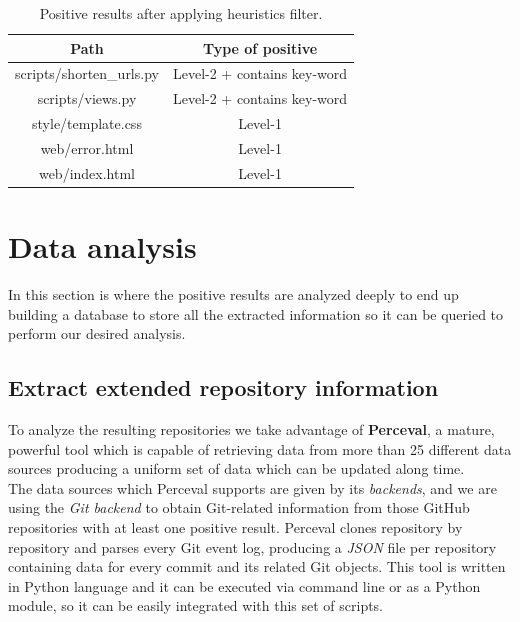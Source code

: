 \documentclass[a4paper, 12pt]{book}
\begin{document}
\begin{table}[]
\centering
\caption{Positive results after applying heuristics filter.}
\label{table:heuristics-positive-example}
\begin{tabular}{|c|c|}
\hline
\textbf{Path}              & \textbf{Type of positive}   \\ \hline
scripts/shorten\_urls.py & Level-2 + contains key-word   \\
scripts/views.py           & Level-2 + contains key-word \\
style/template.css         & Level-1                     \\
web/error.html             & Level-1                     \\
web/index.html             & Level-1                     \\ \hline
\end{tabular}
\end{table}
\section{Data analysis}
\label{sec:data-analysis}
In this section is where the positive results are analyzed deeply to end up building a database to store
all the extracted information so it can be queried to perform our desired analysis.
\subsection{Extract extended repository information}
\label{ssec:extract-perceval}
To analyze the resulting repositories we take advantage of \textbf{Perceval}, a mature, powerful tool which
is capable of retrieving data from more than 25 different data sources producing a uniform set of data which can be
updated along time.\\
The data sources which Perceval supports are given by its \emph{backends}, and we are using the \emph{Git backend} to
obtain Git-related information from those GitHub repositories with at least one positive result.
Perceval clones repository by repository and parses every Git event log, producing a \emph{JSON} file
per repository containing data for every commit and its related Git objects. This tool is written in Python
language and it can be executed via command line or as a Python module, so it can be easily integrated with
this set of scripts.\\
\end{document}
